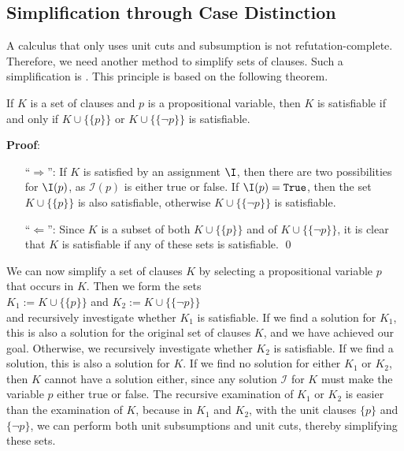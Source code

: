 \subsection{Simplification through Case Distinction}
A calculus that only uses unit cuts and subsumption is not refutation-complete. Therefore, we need another method to simplify sets of clauses.
Such a simplification is . This principle is based on the following theorem.

\begin{Satz}
  If $K$ is a set of clauses and $p$ is a propositional variable,
  then $K$ is satisfiable if and only if $K \cup \bigl\{\{p\}\bigr\}$ or
  $K \cup \bigl\{\{\neg p\}\bigr\}$ is satisfiable.
\end{Satz}

\noindent
\textbf{Proof}:
\begin{enumerate}
\item[``$\Rightarrow$'':] 
  If $K$ is satisfied by an assignment $\I$, then there are two possibilities for $\I(p)$, as 
  $\mathcal{I}(p)$ is either true or false. If $\I(p) = \texttt{True}$, then the set $K \cup
  \bigl\{\{p\}\bigr\}$ is also satisfiable,
  otherwise $K \cup \bigl\{\{\neg p\}\bigr\}$
  is satisfiable.
\item[``$\Leftarrow$'':] 
  Since $K$ is a subset of both $K \cup \bigl\{\{p\}\bigr\}$ and of 
  $K \cup \bigl\{\{\neg p\}\bigr\}$, it is clear that $K$ is satisfiable
  if any of these sets is satisfiable.
\qed
\end{enumerate}

We can now simplify a set of clauses $K$ by selecting a propositional variable $p$ that occurs in $K$.
Then we form the sets \\[0.2cm]
\hspace*{1.3cm} $K_1 := K \cup \bigl\{\{p\}\bigr\}$ \quad and \quad $K_2 := K \cup
\bigl\{\{\neg p\}\bigr\}$
\\[0.2cm]
and recursively investigate whether $K_1$ is satisfiable. If we find a solution for $K_1$,
this is also a solution for the original set of clauses $K$, and we have achieved our goal.
Otherwise, we recursively investigate whether $K_2$ is satisfiable.
If we find a solution, this is also a solution for $K$. If we find no solution
for either $K_1$ or $K_2$, then $K$ cannot have a solution either,
since any solution $\mathcal{I}$ for $K$ must make the variable $p$ either true or false.
The recursive examination of $K_1$ or $K_2$ is easier than the examination of $K$,
because in $K_1$ and $K_2$, with the unit clauses $\{p\}$ and $\{\neg p\}$,
we can perform both unit subsumptions and unit cuts, thereby simplifying these sets.

